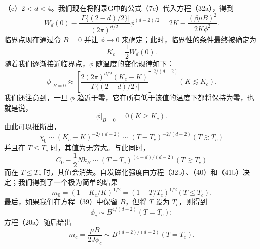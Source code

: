 （c）\(2 < d < 4\)。我们现在将附录G中的公式（7c）代入方程（32a），得到
\begin{equation}\tag{13.4.69}\label{eq:13.4.69}
W _ { d } ( 0 ) - \frac { | \Gamma \{ ( 2 - d ) / 2 \} | } { ( 2 \pi ) ^{d / 2} } \phi ^{( d - 2 ) / 2} = 2 K - \frac { ( \beta \mu B ) ^{2} } { 2 K \phi ^{2} } .
\end{equation}
临界点现在通过令 \(B=0\) 并让 \(\phi\to0\) 来确定；此时，临界性的条件最终被确定为
\begin{equation}\tag{13.4.70}\label{eq:13.4.70}
K _ { c } = \frac { 1 } { 2 } W _ { d } ( 0 ) .
\end{equation}
随着我们逐渐接近临界点，\(\phi\) 随温度的变化规律如下：
\begin{equation}\tag{13.4.71}\label{eq:13.4.71}
\phi | _ { B = 0 } \approx \left[ \frac { 2 ( 2 \pi ) ^{d / 2} ( K _ { c } - K ) } { | \Gamma \{ ( 2 - d ) / 2 \} | } \right] ^{2 / ( d - 2 )}  ( K \lesssim K _ { c } ) .
\end{equation}
我们还注意到，一旦 \(\phi\) 趋近于零，它在所有低于该值的温度下都将保持为零，也就是说，
\begin{equation}\tag{13.4.72}\label{eq:13.4.72}
\phi | _ { B = 0 } = 0  ( K \geq K _ { c } ) .
\end{equation}
由此可以推断出，
\begin{equation}\tag{13.4.73}\label{eq:13.4.73}
\chi _ { 0 } \sim ( K _ { c } - K ) ^{- 2 / ( d - 2 )} \sim ( T - T _ { c } ) ^{- 2 / ( d - 2 )}  ( T \gtrsim T _ { c } )
\end{equation}
并且在 \(T \leq T_{c}\) 时，其值为无穷大。与此同时，
\begin{equation}\tag{13.4.74}\label{eq:13.4.74}
C _ { 0 } - \frac { 1 } { 2 } N k _ { B } \sim ( T - T _ { c } ) ^{( 4 - d ) / ( d - 2 )}  ( T \gtrsim T _ { c } )
\end{equation}
而在 \(T \leq T_{c}\) 时，其值会消失。自发磁化强度由方程（32b）、（40）和（41b）决定；我们得到了一个极为简单的结果
\begin{equation}\tag{13.4.75}\label{eq:13.4.75}
m _ { 0 } = ( 1 - K _ { c } / K ) ^{1 / 2} = ( 1 - T / T _ { c } ) ^{1 / 2}  ( T \leq T _ { c } ) .
\end{equation}
最后，如果我们在方程（39）中保留 \(B\)，但将 \(T\) 设为 \(T_c\)，则得到
\begin{equation}\tag{13.4.76}\label{eq:13.4.76}
\phi _ { c } \sim B ^{4 / ( d + 2 )}  ( T = T _ { c } ) ;
\end{equation}
方程（20a）随后给出
\begin{equation}\tag{13.4.77}\label{eq:13.4.77}
m _ { c } = \frac { \mu B } { 2 J \phi _ { c } } \sim B ^{( d - 2 ) / ( d + 2 )}  ( T = T _ { c } ) .
\end{equation}
